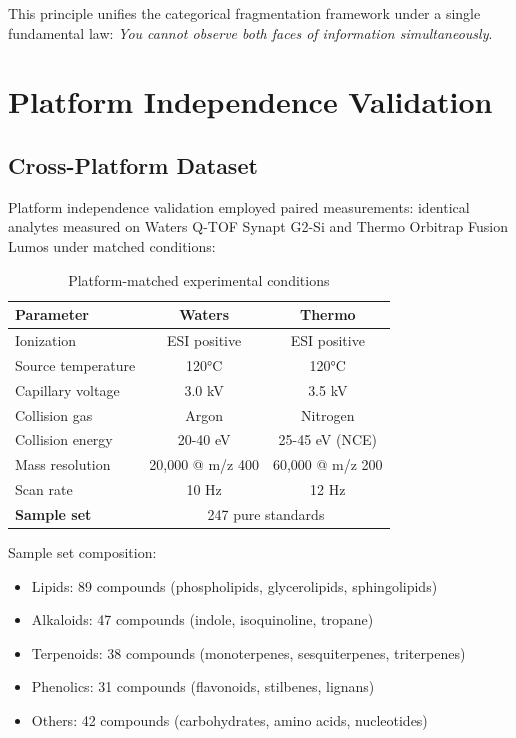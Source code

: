 \documentclass[twocolumn,10pt,a4paper]{article}
\theoremstyle{definition}
\theoremstyle{remark}
\begin{document}
This principle unifies the categorical fragmentation framework under a single fundamental law: \emph{You cannot observe both faces of information simultaneously}.

\section{Platform Independence Validation}
\label{sec:platform}

\subsection{Cross-Platform Dataset}

Platform independence validation employed paired measurements: identical analytes measured on Waters Q-TOF Synapt G2-Si and Thermo Orbitrap Fusion Lumos under matched conditions:

\begin{table}[h]
\centering
\caption{Platform-matched experimental conditions}
\label{tab:platform_conditions}
\begin{tabular}{lcc}
\toprule
\textbf{Parameter} & \textbf{Waters} & \textbf{Thermo} \\
\midrule
Ionization & ESI positive & ESI positive \\
Source temperature & 120°C & 120°C \\
Capillary voltage & 3.0 kV & 3.5 kV \\
Collision gas & Argon & Nitrogen \\
Collision energy & 20-40 eV & 25-45 eV (NCE) \\
Mass resolution & 20,000 @ m/z 400 & 60,000 @ m/z 200 \\
Scan rate & 10 Hz & 12 Hz \\
\midrule
\textbf{Sample set} & \multicolumn{2}{c}{247 pure standards} \\
\bottomrule
\end{tabular}
\end{table}

Sample set composition:
\begin{itemize}
\item Lipids: 89 compounds (phospholipids, glycerolipids, sphingolipids)
\item Alkaloids: 47 compounds (indole, isoquinoline, tropane)
\item Terpenoids: 38 compounds (monoterpenes, sesquiterpenes, triterpenes)
\item Phenolics: 31 compounds (flavonoids, stilbenes, lignans)
\item Others: 42 compounds (carbohydrates, amino acids, nucleotides)
\end{itemize}
\end{document}
